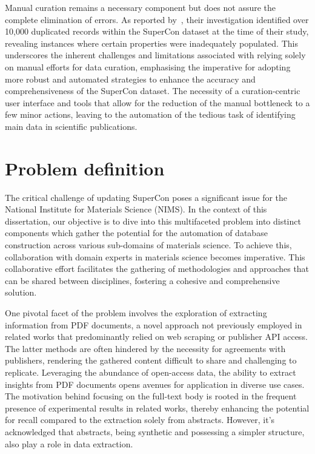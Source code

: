 Manual curation remains a necessary component but does not assure the complete elimination of errors. As reported by~\cite{sommer20223dsc}, their investigation identified over 10,000 duplicated records within the SuperCon dataset at the time of their study, revealing instances where certain properties were inadequately populated. 
This underscores the inherent challenges and limitations associated with relying solely on manual efforts for data curation, emphasising the imperative for adopting more robust and automated strategies to enhance the accuracy and comprehensiveness of the SuperCon dataset.
The necessity of a curation-centric user interface and tools that allow for the reduction of the manual bottleneck to a few minor actions, leaving to the automation of the tedious task of identifying main data in scientific publications.


\section{Problem definition}

The critical challenge of updating SuperCon poses a significant issue for the National Institute for Materials Science (NIMS).
In the context of this dissertation, our objective is to dive into this multifaceted problem into distinct components which gather the potential for the automation of database construction across various sub-domains of materials science. 
To achieve this, collaboration with domain experts in materials science becomes imperative. This collaborative effort facilitates the gathering of methodologies and approaches that can be shared between disciplines, fostering a cohesive and comprehensive solution.

One pivotal facet of the problem involves the exploration of extracting information from PDF documents, a novel approach not previously employed in related works that predominantly relied on web scraping or publisher API access. 
The latter methods are often hindered by the necessity for agreements with publishers, rendering the gathered content difficult to share and challenging to replicate.
Leveraging the abundance of open-access data, the ability to extract insights from PDF documents opens avenues for application in diverse use cases. 
The motivation behind focusing on the full-text body is rooted in the frequent presence of experimental results in related works, thereby enhancing the potential for recall compared to the extraction solely from abstracts. 
However, it's acknowledged that abstracts, being synthetic and possessing a simpler structure, also play a role in data extraction.

